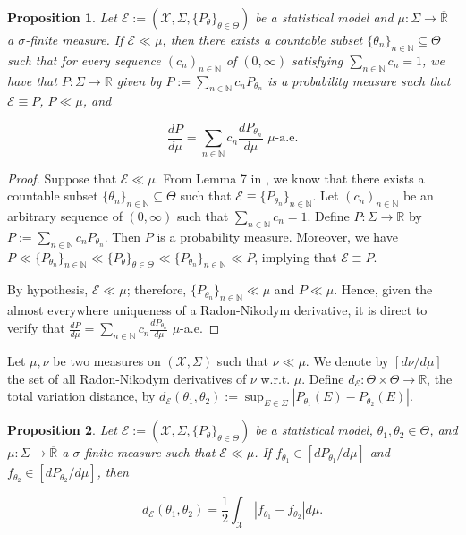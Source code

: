 \documentclass[12pt]{article}
\newtheorem{proposition}{Proposition}[section]
\begin{document}
\begin{proposition}
\label{prop:4.2}
Let $\mathcal{E}:=(\mathcal{X},\Sigma,\{P_\theta\}_{\theta\in\Theta})$ be a statistical model and $\mu \!:\!\Sigma\to\overline{\mathbb{R}}$ a $\sigma$-finite measure. If $\mathcal{E}\ll \mu $, then there exists a countable subset $\{\theta _n\}_{n\in\mathbb{N}}\subseteq\Theta$ such that for every sequence $(c_n)_{n\in\mathbb{N}}$ of $(0,\infty )$ satisfying $\sum _{n\in\mathbb{N}}c_n=1$, we have that $P:\Sigma\to \mathbb{R}$ given by ${P}:=\sum _{n\in\mathbb{N}}c_nP_{\theta _n}$ is a probability measure such that $\mathcal{E}\equiv {P}$, $P\ll \mu $, and 

$$\frac{d{P}}{d\mu }=\sum _{n\in\mathbb{N}}c_n \frac{dP_{\theta _n}}{d\mu } \,\,\mu\text{-a.e.}$$
\end{proposition}

\begin{proof}
Suppose that $\mathcal{E}\ll \mu $. From Lemma 7 in \cite{Halmos1949}, we know that there exists a countable subset $\{\theta _n\}_{n\in\mathbb{N}}\subseteq\Theta $ such that $\mathcal{E}\equiv \{P_{\theta _n}\}_{n\in\mathbb{N}}$. Let $(c_n)_{n\in\mathbb{N}}$ be an arbitrary sequence of $(0,\infty)$ such that $\sum _{n\in\mathbb{N}}c_n=1$. Define $P:\Sigma\to \mathbb{R}$ by ${P}:=\sum _{n\in\mathbb{N}}c_nP_{\theta _n}$. Then $P$ is a probability measure. Moreover, we have ${P}\ll \{P_{\theta _n}\}_{n\in\mathbb{N}}\ll \{P_\theta \}_{\theta \in \Theta }\ll \{P_{\theta _n}\}_{n\in\mathbb{N}}\ll {P}$, implying that $\mathcal{E}\equiv {P}$.

By hypothesis, $\mathcal{E}\ll \mu $; therefore, $\{P_{\theta _n}\}_{n\in\mathbb{N}}\ll \mu $ and ${P}\ll \mu $. Hence, given the almost everywhere uniqueness of a Radon-Nikodym derivative, it is direct to verify that $\frac{d{P}}{d\mu }=\sum _{n\in\mathbb{N}}c_n \frac{dP_{\theta _n}}{d\mu }$ $\mu$-a.e.
\end{proof}

Let $\mu ,\nu $ be two measures on $(\mathcal{X},\Sigma )$ such that $\nu \ll \mu $. We denote by $[d\nu /d\mu ]$ the set of all Radon-Nikodym derivatives of $\nu$ w.r.t. $\mu$. Define $d_\mathcal{E}:\Theta\times \Theta \to \mathbb{R}$, the total variation distance, by $d_\mathcal{E}(\theta _1,\theta _2):=\sup _{E\in\Sigma }|P_{\theta _1}(E)-P_{\theta _2}(E)|.$ 

\begin{proposition}
\label{prop:4.3}
Let $\mathcal{E}:=(\mathcal{X},\Sigma,\{P_\theta\}_{\theta\in\Theta})$ be a statistical model, $\theta_1,\theta _2\in\Theta$, and $\mu:\Sigma\to\overline{\mathbb{R}}$ a $\sigma$-finite measure such that $\mathcal{E}\ll \mu $. If $f_{\theta _1}\in [dP_{\theta _1}/d\mu  ]$ and $f_{\theta _2}\in [dP_{\theta _2}/d\mu ]$, then

$$d_\mathcal{E}(\theta _1,\theta _2)=\frac{1}{2}\int _\mathcal{X}|f_{\theta _1}-f_{\theta _2}|d\mu. $$
\end{proposition}
\end{document}
